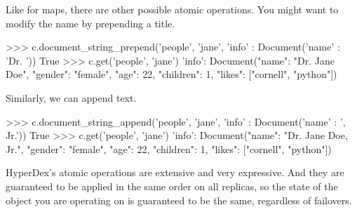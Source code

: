 Like for maps, there are other possible atomic operations. You might want to modify the name by prepending a title.

\begin{pythoncode}
>>> c.document_string_prepend('people', 'jane', {'info' : Document({'name' : 'Dr. '})})
True
>>> c.get('people', 'jane')
{'info': Document({"name": "Dr. Jane Doe", "gender": "female", "age": 22, "children": 1, "likes": ["cornell", "python"]})}
\end{pythoncode}

Similarly, we can append text. 

\begin{pythoncode}
>>> c.document_string_append('people', 'jane', {'info' : Document({'name' : ', Jr.'})})
True
>>> c.get('people', 'jane')
{'info': Document({"name": "Dr. Jane Doe, Jr.", "gender": "female", "age": 22, "children": 1, "likes": ["cornell", "python"]})}
\end{pythoncode}



HyperDex's atomic operations are extensive and very expressive. And they are
guaranteed to be applied in the same order on all replicas, so the state of the
object you are operating on is guaranteed to be the same, regardless of
failovers.
